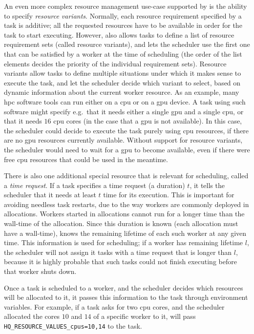 An even more complex resource management use-case supported by \hyperqueue{} is the
ability to specify \emph{resource variants}. Normally, each resource requirement specified by a task
is additive; all the requested resources have to be available in order for the task to start
executing. However, \hq{} also allows tasks to define a list of resource
requirement sets (called resource variants), and lets the scheduler use the first one that can be
satisfied by a worker at the time of scheduling (the order of the list elements decides the
priority of the individual requirement sets). Resource variants allow tasks to define multiple
situations under which it makes sense to execute the task, and let the scheduler decide which
variant to select, based on dynamic information about the current worker resource. As an example,
many \gls{hpc} software tools can run either on a \gls{cpu} or on a
\gls{gpu} device. A task using such software might specify e.g.\ that it needs either
a single \gls{gpu} and a single \gls{cpu}, or that it needs
$16$ \gls{cpu} cores (in the case that a \gls{gpu} is
not available). In this case, the scheduler could decide to execute the task purely using
\gls{cpu} resources, if there are no \gls{gpu} resources currently
available. Without support for resource variants, the scheduler would need to wait for a
\gls{gpu} to become available, even if there were free \gls{cpu}
resources that could be used in the meantime.

There is also one additional special resource that is relevant for scheduling, called a
\emph{time request}. If a task specifies a time request (a duration) $t$, it
tells the scheduler that it needs at least $t$ time for its execution. This is
important for avoiding needless task restarts, due to the way \hq{} workers are
commonly deployed in allocations. Workers started in allocations cannot run for a longer time than
the wall-time of the allocation. Since this duration is known (each allocation must have a
wall-time), \hq{} knows the remaining lifetime of each such worker at any given
time. This information is used for scheduling; if a worker has remaining lifetime
$l$, the scheduler will not assign it tasks with a time request that is longer
than $l$, because it is highly probable that such tasks could not finish
executing before that worker shuts down.

Once a task is scheduled to a worker, and the scheduler decides which resources will be allocated
to it, it passes this information to the task through environment variables. For example, if a task
asks for two \gls{cpu} cores, and the scheduler allocated the cores
$10$ and $14$ of a specific worker to it,
\hq{} will pass \texttt{HQ\_RESOURCE\_VALUES\_cpus=10,14} to the task.

